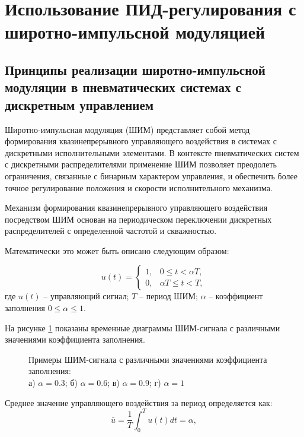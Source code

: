 \section{Использование ПИД-регулирования с широтно-импульсной модуляцией}\label{sec:ch3/sec2}

\subsection*{Принципы реализации широтно-импульсной модуляции в пневматических системах с дискретным управлением}\label{subsec:ch3/sec2/sub1}
Широтно-импульсная модуляция (ШИМ) представляет собой метод формирования квазинепрерывного
управляющего воздействия в системах с дискретными исполнительными элементами.
В контексте пневматических систем с дискретными распределителями применение ШИМ
позволяет преодолеть ограничения, связанные с бинарным характером управления, и обеспечить более
точное регулирование положения и скорости исполнительного механизма.

Механизм формирования квазинепрерывного управляющего воздействия
посредством ШИМ основан на периодическом переключении дискретных
распределителей с определенной частотой и скважностью.

Математически это может быть описано следующим образом:

\begin{equation}
	u(t) = \begin{cases}
		1, & 0 \leq t < \alpha T, \\
		0, & \alpha T \leq t < T,
	\end{cases}
\end{equation}
где $u(t)$ -- управляющий сигнал;
$T$ -- период ШИМ;
$\alpha$ -- коэффициент заполнения $0 \leq \alpha \leq 1$.

На рисунке \ref{fig:ch3:pwm_example} показаны временные диаграммы ШИМ-сигнала
с различными значениями коэффициента заполнения.

\begin{figure}[ht]
	\caption{Примеры ШИМ-сигнала с различными значениями коэффициента заполнения:\\
		а) $\alpha = \num{0.3}$; б) $\alpha = \num{0.6}$; в) $\alpha = \num{0.9}$; г) $\alpha = \num{1}$}
	\label{fig:ch3:pwm_example}
\end{figure}

Среднее значение управляющего воздействия за период определяется как:
\begin{equation}
	\bar{u} = \frac{1}{T} \int_0^T u(t) dt = \alpha,
\end{equation}

